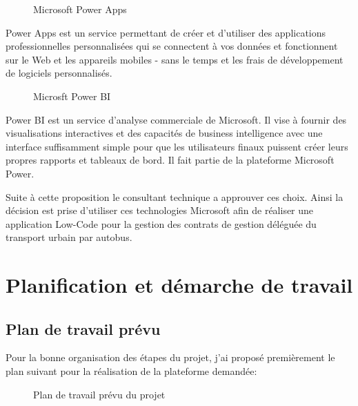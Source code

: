 \documentclass[a4paper]{report}
\begin{document}
\begin{doublespace}
\begin{figure}[H]
\begin{center}
			\caption{Microsoft Power Apps}
		\end{center}
	\end{figure}
	Power Apps est un service permettant de créer
	et d'utiliser des applications professionnelles
	personnalisées qui se connectent à vos
	données et fonctionnent sur le Web et les
	appareils mobiles - sans le temps et les frais
	de développement de logiciels personnalisés.
	\begin{figure}[H]
		\begin{center}
			\caption{Microsft Power BI}
		\end{center}
	\end{figure}
	Power BI est un service d'analyse
	commerciale de Microsoft. Il vise à fournir des
	visualisations interactives et des capacités de
	business intelligence avec une interface
	suffisamment simple pour que les utilisateurs
	finaux puissent créer leurs propres rapports et
	tableaux de bord. Il fait partie de la plateforme
	Microsoft Power.

	Suite à cette proposition le consultant technique a approuver ces choix. Ainsi la décision est prise d'utiliser ces technologies Microsoft afin de réaliser une application Low-Code pour la gestion des contrats de gestion déléguée du transport urbain par autobus.
	\section{Planification et démarche de travail}
	\subsection{Plan de travail prévu}
	Pour la bonne organisation des étapes du projet, j'ai proposé premièrement le plan suivant pour la réalisation de la plateforme demandée:
	\begin{figure}[H]
		\begin{center}
			\caption{Plan de travail prévu du projet}
		\end{center}
	\end{figure}

\end{doublespace}
\end{document}

